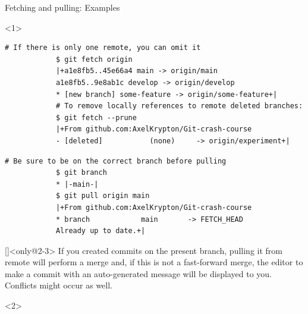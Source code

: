 \documentclass[usenames,svgnames,14pt]{beamer}
\begin{document}
\begin{frame}[fragile]{Fetching and pulling: Examples}
    \begin{onlyenv}<1>
        \vspace{5mm}
        \begin{lstlisting}[style=MyBash]
            # If there is only one remote, you can omit it
            $ git fetch origin
            |+a1e8fb5..45e66a4 main -> origin/main
            a1e8fb5..9e8ab1c develop -> origin/develop
            * [new branch] some-feature -> origin/some-feature+|
            # To remove locally references to remote deleted branches:
            $ git fetch --prune
            |+From github.com:AxelKrypton/Git-crash-course
            - [deleted]           (none)     -> origin/experiment+|
        \end{lstlisting}
        \begin{lstlisting}[style=MyBash]
            # Be sure to be on the correct branch before pulling
            $ git branch
            * |-main-|
            $ git pull origin main
            |+From github.com:AxelKrypton/Git-crash-course
            * branch            main       -> FETCH_HEAD
            Already up to date.+|
        \end{lstlisting}
    \end{onlyenv}
    \begin{overlayarea}{\textwidth}{0.7\textheight}
        \vspace{-6mm}
        \begin{varblock}{}[\textwidth]{}<only@2-3>
            If you created commits on the present branch, pulling it from remote will perform a merge and, if this is not a fast-forward merge, the editor to make a commit with an auto-generated message will be displayed to you. \alert{Conflicts might occur as well.}
        \end{varblock}
        \begin{onlyenv}<2>
            \begin{center}
\end{center}
\end{onlyenv}
\end{overlayarea}
\end{frame}
\end{document}
